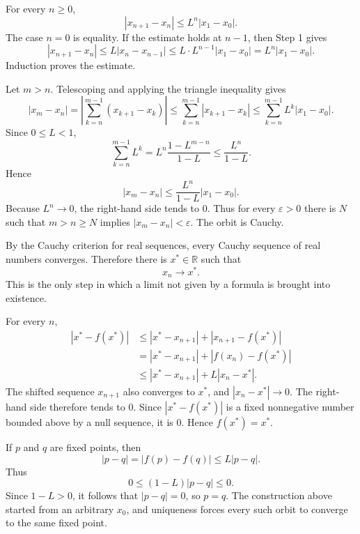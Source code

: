 \begin{remark*}[Interpretation]
For every \(n\ge 0\),
\[
  |x_{n+1}-x_n|\le L^n|x_1-x_0|.
\]
The case \(n=0\) is equality. If the estimate holds at \(n-1\), then Step 1
gives
\[
  |x_{n+1}-x_n|
  \le
  L|x_n-x_{n-1}|
  \le
  L\cdot L^{n-1}|x_1-x_0|
  =
  L^n|x_1-x_0|.
\]
Induction proves the estimate.
\end{remark*}

\begin{remark*}[Interpretation]
Let \(m>n\). Telescoping and applying the triangle inequality gives
\[
  |x_m-x_n|
  =
  \left|\sum_{k=n}^{m-1}(x_{k+1}-x_k)\right|
  \le
  \sum_{k=n}^{m-1}|x_{k+1}-x_k|
  \le
  \sum_{k=n}^{m-1}L^k|x_1-x_0|.
\]
Since \(0\le L<1\),
\[
  \sum_{k=n}^{m-1}L^k
  =
  L^n\frac{1-L^{m-n}}{1-L}
  \le
  \frac{L^n}{1-L}.
\]
Hence
\[
  |x_m-x_n|
  \le
  \frac{L^n}{1-L}|x_1-x_0|. \tag{\(\ast\)}
\]
Because \(L^n\to0\), the right-hand side tends to \(0\). Thus for every
\(\varepsilon>0\) there is \(N\) such that \(m>n\ge N\) implies
\(|x_m-x_n|<\varepsilon\). The orbit is Cauchy.
\end{remark*}

\begin{remark*}[Interpretation]
By the Cauchy criterion for real sequences, every Cauchy sequence of real
numbers converges. Therefore there is \(x^\ast\in\mathbb{R}\) such that
\[
  x_n\to x^\ast .
\]
This is the only step in which a limit not given by a formula is brought into
existence.
\end{remark*}

\begin{remark*}[Interpretation]
For every \(n\),
\[
\begin{aligned}
  |x^\ast-f(x^\ast)|
  &\le |x^\ast-x_{n+1}|+|x_{n+1}-f(x^\ast)|\\
  &= |x^\ast-x_{n+1}|+|f(x_n)-f(x^\ast)|\\
  &\le |x^\ast-x_{n+1}|+L|x_n-x^\ast|.
\end{aligned}
\]
The shifted sequence \(x_{n+1}\) also converges to \(x^\ast\), and
\(|x_n-x^\ast|\to0\). The right-hand side therefore tends to \(0\). Since
\(|x^\ast-f(x^\ast)|\) is a fixed nonnegative number bounded above by a null
sequence, it is \(0\). Hence \(f(x^\ast)=x^\ast\).
\end{remark*}

\begin{remark*}[Interpretation]
If \(p\) and \(q\) are fixed points, then
\[
  |p-q|
  =
  |f(p)-f(q)|
  \le
  L|p-q|.
\]
Thus
\[
  0\le (1-L)|p-q|\le0.
\]
Since \(1-L>0\), it follows that \(|p-q|=0\), so \(p=q\). The construction above
started from an arbitrary \(x_0\), and uniqueness forces every such orbit to
converge to the same fixed point.
\end{remark*}

